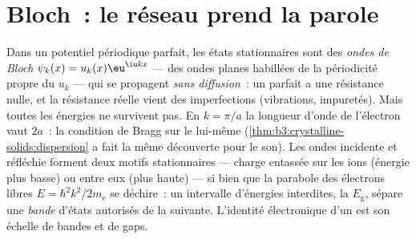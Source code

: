 \section{Bloch~: le réseau prend la parole}

\begin{theorem}\label{thm:b3:electrons-in-solids:bloch}
Dans un potentiel périodique parfait, les états stationnaires sont des
\emph{ondes de Bloch} $\psi_k(x) = u_k(x)\eu^{\iu kx}$ --- des ondes
planes habillées de la périodicité propre du  $u_k$ --- qui se
propagent \emph{sans diffusion}~: un  parfait a une résistance
nulle, et la résistance réelle vient des imperfections (vibrations,
impuretés). Mais toutes les énergies ne survivent pas. En
$k = \pi/a$ la longueur d'onde de l'électron vaut $2a$~: la condition
de Bragg sur le  lui-même
(\cref{thm:b3:crystalline-solids:dispersion} a fait la même
découverte pour le son). Les ondes incidente et réfléchie forment deux
motifs stationnaires --- charge entassée sur les ions (énergie plus
basse) ou entre eux (plus haute) --- si bien que la parabole des
électrons libres $E = \hbar^2k^2/2m_{\text{e}}$ se déchire~: un
intervalle d'énergies interdites, la \emph{}
$E_{\text{g}}$, sépare une \emph{bande} d'états autorisés de la
suivante. L'identité électronique d'un  est son échelle de
bandes et de gaps.
\end{theorem}
\admitted

